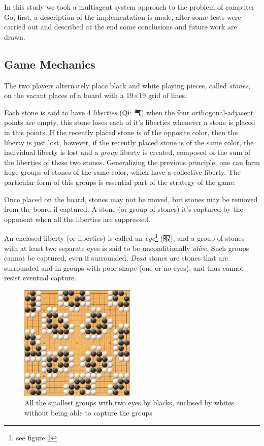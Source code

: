 \documentclass[a4paper,10pt,twocolumn]{article}
\begin{document}
\begin{CJK*}{UTF8}{gbsn}
In this study we took a multiagent system approach to the problem of computer Go, first, a description of the implementation is made, after some tests were carried out and described at the end some conclusions and future work are drawn.


\subsection{Game Mechanics}
The two players alternately place black and white playing pieces, called \emph{stones}, on the vacant places of a board with a 19×19 grid of lines. 

Each stone is said to have 4 \emph{liberties} ({Qì:  气})  when the four orthogonal-adjacent points are empty, this stone loses each of it's liberties whenever a stone is placed in this points. If the recently placed stone is of the opposite color, then the liberty is just lost, however, if the recently placed stone is of the same color, the individual liberty is lost and a \emph{group} liberty is created, composed of the sum of the liberties of these two stones. Generalizing the previous principle, one can form huge groups of stones of the same color, which have a collective liberty. The particular form of this groups is essential part of the strategy of the game. 

Once placed on the board, stones may not be moved, but stones may be removed from the board if captured. A stone (or group of stones) it's captured by the opponent when all the liberties are suppressed.

 An enclosed liberty (or liberties) is called an \emph{eye}\footnote{see figure \ref{f1}} (眼), and a group of stones with at least two separate eyes is said to be unconditionally \emph{alive}. Such groups cannot be captured, even if surrounded. \emph{Dead} stones are stones that are surrounded and in groups with poor shape (one or no eyes), and thus cannot resist eventual capture.

\begin{figure}[!ht]
\begin{center}
\includegraphics[width=5.5cm]{eyes.png}
\caption{\footnotesize All the smallest groups with two eyes by blacks, enclosed by whites without being able to capture the groups \label{f1}}
\end{center}
\end{figure}


\end{CJK*}
\end{document}

